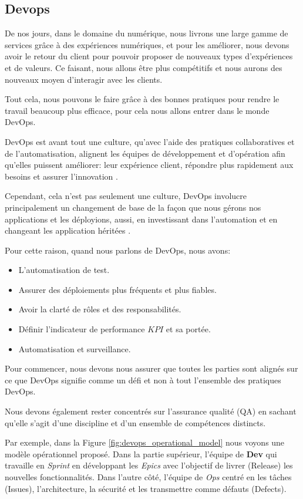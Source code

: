 \subsection{Devops}\label{sec:devops}
De nos jours, dans le domaine du numérique, nous livrons une large gamme de services grâce à des expériences numériques, et pour les améliorer, nous devons avoir le retour du client pour pouvoir proposer de nouveaux types d’expériences et de valeurs. Ce faisant, nous allons être plus compétitifs et nous aurons des nouveaux moyen d'interagir avec les clients.

Tout cela, nous pouvons le faire grâce à des bonnes pratiques pour rendre le travail beaucoup plus efficace, pour cela nous allons entrer dans le monde DevOps.

DevOps est avant tout une culture, qu'avec l'aide des pratiques collaboratives et de l'automatisation, alignent les équipes de développement et d'opération afin qu'elles puissent améliorer: leur expérience client, répondre plus rapidement aux besoins et assurer l'innovation \cite{IsaacSacolick2016DrivingCulture}.

Cependant, cela n'est pas seulement une culture, DevOps involucre principalement un changement de base de la façon que nous gérons nos applications et les déployions, aussi, en investissant dans l'automation et en changeant les application héritées \cite{benjamin_wootton}.

Pour cette raison, quand nous parlons de DevOps, nous avons:

\begin{itemize}
\item L'automatisation de test.
\item Assurer des déploiements plus fréquents et plus fiables.
\item Avoir la clarté de rôles et des responsabilités.
\item Définir l'indicateur de performance \(KPI\) et sa portée.
\item Automatisation et surveillance.
\end{itemize}

Pour commencer, nous devons nous assurer que toutes les parties sont alignés sur ce que DevOps signifie comme un défi et non à tout l’ensemble des pratiques DevOps.

Nous devons également rester concentrés sur l’assurance qualité (QA) en sachant qu’elle s’agit d’une discipline et d’un ensemble de compétences distincts.

Par exemple, dans la Figure \ref{fig:devops_operational_model} nous voyons une modèle opérationnel proposé. Dans la partie supérieur, l'équipe de \textbf{Dev} qui travaille en \textit{Sprint} en développant les \textit{Epics} avec l'objectif de livrer (Release) les nouvelles fonctionnalités. Dans l'autre côté, l'équipe de \textit{Ops} centré en les tâches (Issues), l'architecture, la sécurité et les transmettre comme défauts (Defects).


